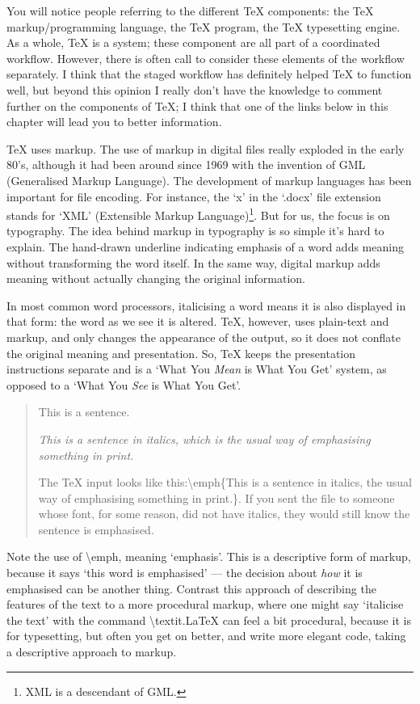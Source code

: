 \documentclass[11pt, oneside]{memoir}
\begin{document}
You will notice people referring to the different TeX components: the TeX markup/programming language, the TeX program, the TeX typesetting engine. As a whole, TeX is a system; these component are all part of a coordinated workflow. However, there is often call to consider these elements of the workflow separately. I think that the staged workflow has definitely helped TeX to function well, but beyond this opinion I really don't have the knowledge to comment further on the components of TeX; I think that one of the links below in this chapter will lead you to better information.

TeX uses markup. The use of markup in digital files really exploded in the early 80's, although it had been around since 1969 with the invention of GML (Generalised Markup Language). The development of markup languages has been important for file encoding. For instance, the `x' in the `.docx' file extension stands for `XML' (Extensible Markup Language)\footnote{XML is a descendant of GML.}. But for us, the focus is on typography. The idea behind markup in typography is so simple it's hard to explain. The hand-drawn underline indicating emphasis of a word adds meaning without transforming the word itself. In the same way, digital markup adds meaning without actually changing the original information. 

In most common word processors, italicising a word means it is also displayed in that form: the word as we see it is altered. TeX, however, uses plain-text and markup, and only changes the appearance of the output, so it does not conflate the original meaning and presentation. So, TeX keeps the presentation instructions separate and is a `What You \emph{Mean} is What You Get' system, as opposed to a `What You \emph{See} is What You Get'.

\begin{quotation}
This is a sentence. 

\emph{This is a sentence in italics, which is the usual way of emphasising something in print.}

The TeX input looks like this:\gc \textbackslash emph\{This is a sentence in italics, the usual way of emphasising something in print.\}. \nf If you sent the file to someone whose font, for some reason, did not have italics, they would still know the sentence is emphasised.
\end{quotation}

Note the use of \gc \textbackslash emph\nf , meaning `emphasis'. This is a descriptive form of markup, because it says `this word is emphasised' — the decision about \emph{how} it is emphasised can be another thing. Contrast this approach of describing the features of the text to a more procedural markup, where one might say `italicise the text' with the command \gc \textbackslash textit.\nf LaTeX can feel a bit procedural, because it is for typesetting, but often you get on better, and write more elegant code, taking a descriptive approach to markup.
\end{document}
